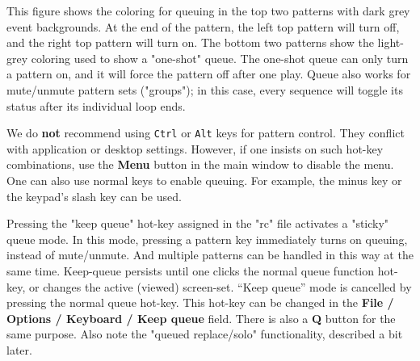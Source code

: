    This figure shows the coloring for queuing in the top two patterns with
   dark grey event backgrounds.  At the end of the pattern, the left top
   pattern will turn off, and the right top pattern will turn on.
   The bottom two patterns show the light-grey coloring used to show
   a "one-shot" queue.  The one-shot queue can only turn a pattern on, and it
   will force the pattern off after one play.
   Queue also works for mute/unmute pattern sets ("groups"); in this case,
   every sequence will toggle its status after its individual loop ends. 

   We do \textbf{not}
   recommend using \texttt{Ctrl} or \texttt{Alt}
   keys for pattern control.  They conflict with application or desktop
   settings.  However, if one insists on such hot-key combinations,
   use the \textbf{Menu} button in the main
   window to disable the menu.
   One can also use normal keys to enable queuing.
   For example, the minus key or the keypad's slash key can be used.

   Pressing the "keep queue" hot-key
   assigned in the "rc" file activates a "sticky" queue mode.
   In this mode, pressing a pattern key immediately turns on queuing, instead
   of mute/unmute.  And multiple patterns can be handled in this way at the
   same time.
   Keep-queue persists until one clicks the normal queue function hot-key,
   or changes the active (viewed) screen-set. 
   “Keep queue” mode is cancelled by pressing the normal queue hot-key.
   This hot-key can be changed in the
   \textbf{File / Options / Keyboard / Keep queue} field.
   There is also a \textbf{Q} button for the same purpose.
   Also note the "queued replace/solo" functionality, described a bit later.

